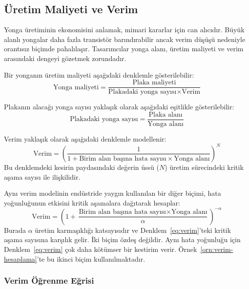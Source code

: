 \subsection{Üretim Maliyeti ve Verim}
\label{sec:maliyet-verim}

Yonga üretiminin ekonomisini anlamak, mimari kararlar için can alıcıdır. Büyük alanlı yongalar daha fazla transistör barındırabilir ancak verim düşüşü nedeniyle orantısız biçimde pahalılaşır. Tasarımcılar yonga alanı, üretim maliyeti ve verim arasındaki dengeyi gözetmek zorundadır.

Bir yonganın üretim maliyeti aşağıdaki denklemle gösterilebilir:
\begin{equation}
\text{Yonga maliyeti} = \frac{\text{Plaka maliyeti}}{\text{Plakadaki yonga sayısı} \times \text{Verim}}
\label{eq:yonga-maliyet}
\end{equation}

Plakanın alacağı yonga sayısı yaklaşık olarak aşağıdaki eşitlikle gösterilebilir:
\begin{equation}
\text{Plakadaki yonga sayısı} = \frac{\text{Plaka alanı}}{\text{Yonga alanı}}
\label{eq:yonga-sayisi}
\end{equation}

Verim yaklaşık olarak aşağıdaki denklemle modellenir:
\begin{equation}
\text{Verim} = \left( \frac{1}{1 + \text{Birim alan başına hata sayısı} \times \text{Yonga alanı}} \right)^{N}
\label{eq:verim}
\end{equation}
Bu denklemdeki kesirin paydasındaki değerin üssü ($N$) üretim sürecindeki kritik aşama sayısı ile ilişkilidir.

Aynı verim modelinin endüstride yaygın kullanılan bir diğer biçimi, hata yoğunluğunun etkisini kritik aşamalara dağıtarak hesaplar:
\begin{equation}
\text{Verim} = \left(1 + \frac{\text{Birim alan başına hata sayısı} \times \text{Yonga alanı}}{\alpha}\right)^{-\alpha}
\label{eq:verim-alfa}
\end{equation}
Burada $\alpha$ üretim karmaşıklığı katsayısıdır ve Denklem~\ref{eq:verim}'teki kritik aşama sayısına karşılık gelir. İki biçim özdeş değildir. Aynı hata yoğunluğu için Denklem~\ref{eq:verim} çok daha kötümser bir kestirim verir. Örnek~\ref{orn:verim-hesaplama}'te bu ikinci biçim kullanılmaktadır.

\subsubsection*{Verim Öğrenme Eğrisi}

